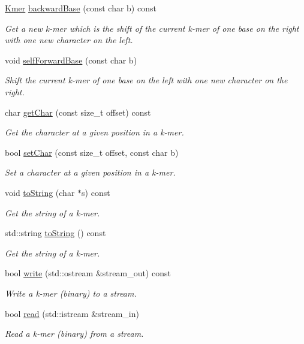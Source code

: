\begin{DoxyCompactItemize}
\hyperlink{classKmer}{Kmer} \hyperlink{classKmer_a7670003b3027c3401454dc700ca5b3c5}{backward\+Base} (const char b) const
\begin{DoxyCompactList}\small\item\em Get a new k-\/mer which is the shift of the current k-\/mer of one base on the right with one new character on the left. \end{DoxyCompactList}\item 
void \hyperlink{classKmer_a605ec250880652507ae279f348046936}{self\+Forward\+Base} (const char b)
\begin{DoxyCompactList}\small\item\em Shift the current k-\/mer of one base on the left with one new character on the right. \end{DoxyCompactList}\item 
char \hyperlink{classKmer_af23c636ad07801e49b09565513da451c}{get\+Char} (const size\+\_\+t offset) const
\begin{DoxyCompactList}\small\item\em Get the character at a given position in a k-\/mer. \end{DoxyCompactList}\item 
bool \hyperlink{classKmer_acd1e99defb65ea71c7cf804d3f1e3dc4}{set\+Char} (const size\+\_\+t offset, const char b)
\begin{DoxyCompactList}\small\item\em Set a character at a given position in a k-\/mer. \end{DoxyCompactList}\item 
void \hyperlink{classKmer_a69125d95f234312a670b970cd14d9ef3}{to\+String} (char $\ast$s) const
\begin{DoxyCompactList}\small\item\em Get the string of a k-\/mer. \end{DoxyCompactList}\item 
std\+::string \hyperlink{classKmer_ae394adf5587405c5204a07df6b95cebb}{to\+String} () const
\begin{DoxyCompactList}\small\item\em Get the string of a k-\/mer. \end{DoxyCompactList}\item 
bool \hyperlink{classKmer_afeabfe32515eb278bdab47d5434e8a92}{write} (std\+::ostream \&stream\+\_\+out) const
\begin{DoxyCompactList}\small\item\em Write a k-\/mer (binary) to a stream. \end{DoxyCompactList}\item 
bool \hyperlink{classKmer_ad7e63cd4337067ac247a52f4b8235204}{read} (std\+::istream \&stream\+\_\+in)
\begin{DoxyCompactList}\small\item\em Read a k-\/mer (binary) from a stream. \end{DoxyCompactList}\end{DoxyCompactItemize}
